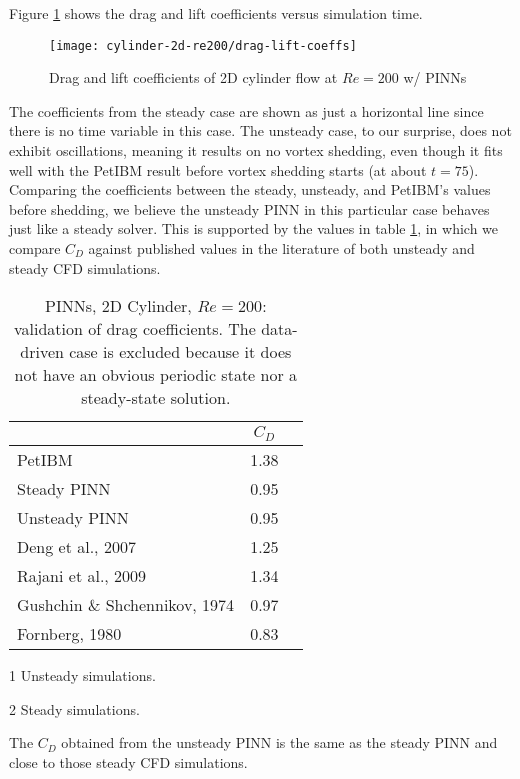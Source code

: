 Figure \ref{fig:cylinder-re200-drag-lift} shows the drag and lift coefficients versus simulation time.
\begin{figure}[t]
    \centering%
    \texttt{[image: cylinder-2d-re200/drag-lift-coeffs]}%
    \caption{%
        Drag and lift coefficients of 2D cylinder flow at $Re=\num{200}$ w/ PINNs
    }
    \label{fig:cylinder-re200-drag-lift}%
\end{figure}
The coefficients from the steady case are shown as just a horizontal line since there is no time variable in this case.
The unsteady case, to our surprise, does not exhibit oscillations, meaning it results on no vortex shedding, even though it fits well with the PetIBM result before vortex shedding starts (at about $t=75$).
Comparing the coefficients between the steady, unsteady, and PetIBM's values before shedding, we believe the unsteady PINN in this particular case behaves just like a steady solver.
This is supported by the values in table \ref{table:cylinder-2d-re200-cd}, in which we compare $C_D$ against published values in the literature of both unsteady and steady CFD simulations.



\begin{table}
    \centering%
    \begin{threeparttable}[b]
        \begin{tabular}{lcc}
            \toprule
            & $C_D$ \\
            \midrule
            PetIBM & 1.38   \\
            Steady PINN & 0.95 \\
            Unsteady PINN & 0.95 \\
            Deng et al., 2007\cite{deng_hydrodynamic_2007}\tnote{1} & 1.25 \\
            Rajani et al., 2009\cite{Rajani2009}\tnote{1} & 1.34 \\
            Gushchin \& Shchennikov, 1974\cite{gushchin_numerical_1974}\tnote{2} & 0.97 \\
            Fornberg, 1980\cite{fornberg_numerical_1980}\tnote{2} & 0.83 \\
            \bottomrule
        \end{tabular}%
        \begin{tablenotes}
            \footnotesize
            \item [1] Unsteady simulations.
            \item [2] Steady simulations.
        \end{tablenotes}
        \caption{%
            PINNs, 2D Cylinder, $Re=200$: validation of drag coefficients.%
            The data-driven case is excluded because it does not have an obvious periodic state nor a steady-state solution.%
        }%
        \label{table:cylinder-2d-re200-cd}
    \end{threeparttable}
\end{table}%
The $C_D$ obtained from the unsteady PINN is the same as the steady PINN and close to those steady CFD simulations.

